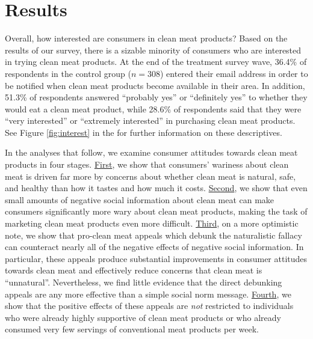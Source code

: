 \documentclass[12pt]{article}
\newcommand{\todo}[1]{\textit{\textcolor{red}{$<$todo$>$ #1 $<$/todo$>$}}}
\begin{document}
\section{Results}
\label{sec:results}



Overall, how interested are consumers in clean meat products? Based on the results of our survey, there is a sizable minority of consumers who are interested in trying clean meat products. At the end of the treatment survey wave, 36.4\% of respondents in the control group ($n=308$) entered their email address in order to be notified when clean meat products become available in their area. In addition, 51.3\% of respondents answered ``probably yes'' or ``definitely yes'' to whether they would eat a clean meat product, while 28.6\% of respondents said that they were ``very interested'' or ``extremely interested'' in purchasing clean meat products. See Figure \ref{fig:interest} in the  for further information on these descriptives.

In the analyses that follow, we examine consumer attitudes towards clean meat products in four stages. \underline{First}, we show that consumers' wariness about clean meat is driven far more by concerns about whether clean meat is natural, safe, and healthy than how it tastes and how much it costs. \underline{Second}, we show that even small amounts of negative social information about clean meat can make consumers significantly more wary about clean meat products, making the task of marketing clean meat products even more difficult. \underline{Third}, on a more optimistic note, we show that pro-clean meat appeals which debunk the naturalistic fallacy can counteract nearly all of the negative effects of negative social information. In particular, these appeals produce substantial improvements in consumer attitudes towards clean meat and effectively reduce concerns that clean meat is ``unnatural''. Nevertheless, we find little evidence that the direct debunking appeals are any more effective than a simple social norm message. \underline{Fourth}, we show that the positive effects of these appeals are \textit{not} restricted to individuals who were already highly supportive of clean meat products or who already consumed very few servings of conventional meat products per week.
\end{document}
